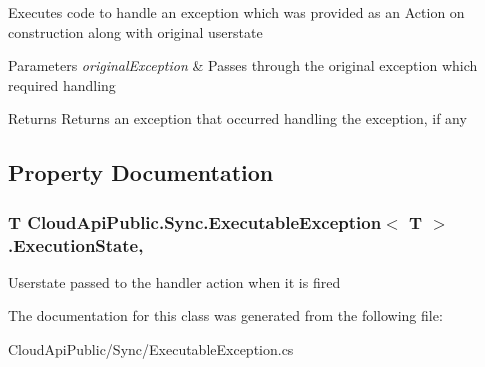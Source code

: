 Executes code to handle an exception which was provided as an Action on construction along with original userstate 


\begin{DoxyParams}{Parameters}
{\em original\-Exception} & Passes through the original exception which required handling\\
\hline
\end{DoxyParams}
\begin{DoxyReturn}{Returns}
Returns an exception that occurred handling the exception, if any
\end{DoxyReturn}


\subsection{Property Documentation}
\hypertarget{class_cloud_api_public_1_1_sync_1_1_executable_exception_3_01_t_01_4_a7ac09d33b3a81c717dc1da3366fdc7e0}{
\subsubsection[{Execution\-State}]{\setlength{\rightskip}{0pt plus 5cm}T Cloud\-Api\-Public.\-Sync.\-Executable\-Exception$<$ T $>$.Execution\-State\hspace{0.3cm}{\ttfamily [get]}, {\ttfamily [set]}}}\label{class_cloud_api_public_1_1_sync_1_1_executable_exception_3_01_t_01_4_a7ac09d33b3a81c717dc1da3366fdc7e0}


Userstate passed to the handler action when it is fired 



The documentation for this class was generated from the following file\-:\begin{DoxyCompactItemize}
\item 
Cloud\-Api\-Public/\-Sync/Executable\-Exception.\-cs\end{DoxyCompactItemize}
